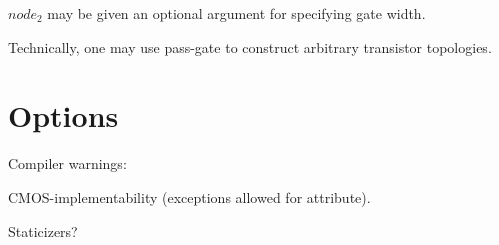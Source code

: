$node_2$ may be given an optional  argument for specifying
gate width.  

Technically, one may use pass-gate to construct arbitrary transistor
topologies.  

\section{Options}
\label{sec:prs:options}

Compiler warnings:

CMOS-implementability (exceptions allowed for attribute).  

Staticizers?

